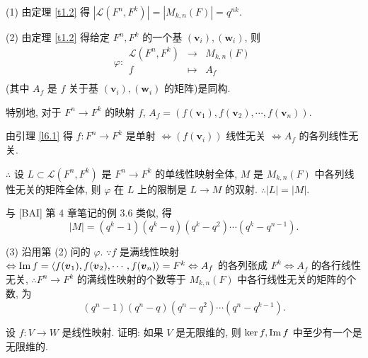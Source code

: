 \documentclass[color=black,device=normal,lang=cn,mode=geye]{elegantnote}
\begin{document}
\begin{solution}
    (1) 由定理 \ref{t1.2} 得 $|\mathcal{L}(F^n,F^k)|=|M_{k,n}(F)|=q^{nk}$.

    (2) 由定理 \ref{t1.2} 得给定 $F^n,F^k$ 的一个基 $(\boldsymbol{v}_i),(\boldsymbol{w}_i)$, 则
    \[\varphi:\begin{array}{rcl}
        \mathcal{L}(F^n,F^k) & \to & M_{k,n}(F) \\
        f & \mapsto & A_f \\
    \end{array}\]
    (其中 $A_f$ 是 $f$ 关于基 $(\boldsymbol{v}_i),(\boldsymbol{w}_i)$ 的矩阵)是同构.

    特别地, 对于 $F^n\to F^k$ 的映射 $f$, $A_f=(f(\boldsymbol{v}_1),f(\boldsymbol{v}_2),\cdots,f(\boldsymbol{v}_n))$.

    由引理 \ref{l6.1} 得 $f:F^n\to F^k$ 是单射 $\Leftrightarrow(f(\boldsymbol{v}_i))$ 线性无关 $\Leftrightarrow A_f$ 的各列线性无关.

    $\therefore$ 设 $L\subset\mathcal{L}(F^n,F^k)$ 是 $F^n\to F^k$ 的单线性映射全体, $M$ 是 $M_{k,n}(F)$ 中各列线性无关的矩阵全体, 则 $\varphi$ 在 $L$ 上的限制是 $L\to M$ 的双射. $\therefore|L|=|M|$.

    与 [BAI] 第 4 章笔记的例 3.6 类似, 得
    \[|M|=(q^k-1)(q^k-q)(q^k-q^2)\cdots(q^k-q^{n-1}).\]

    (3) 沿用第 (2) 问的 $\varphi$. $\because f$ 是满线性映射 $\Leftrightarrow\operatorname{Im} f=\left<f(\boldsymbol{v}_1),f(\boldsymbol{v}_2),\cdots,f(\boldsymbol{v}_n)\right>=F^k\Leftrightarrow A_f$ 的各列张成 $F^k\Leftrightarrow A_f$ 的各行线性无关, $\therefore F^n\to F^k$ 的满线性映射的个数等于 $M_{k,n}(F)$ 中各行线性无关的矩阵的个数, 为
    \[(q^n-1)(q^n-q)(q^n-q^2)\cdots(q^n-q^{k-1}).\]
\end{solution}
\begin{exercisec}[2.1.7]
    设 $f:V\to W$ 是线性映射. 证明: 如果 $V$ 是无限维的, 则 $\ker f,\operatorname{Im} f$ 中至少有一个是无限维的.
\end{exercisec}
\end{document}
